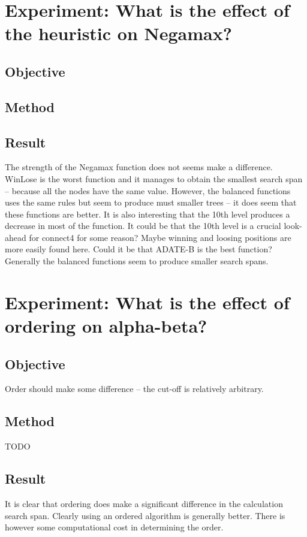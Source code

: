 \section{Experiment: What is the effect of the heuristic on Negamax?}
\subsection*{Objective}
\subsection*{Method}
\subsection*{Result}

The strength of the Negamax function does not seems make a difference.  WinLose is the worst function and it manages to obtain the smallest search span -- because all the nodes have the same value.  However, the balanced functions uses the same rules but seem to produce must smaller trees -- it does seem that these functions are better.  It is also interesting that the 10th level produces a decrease in most of the function.  It could be that the 10th level is a crucial look-ahead for connect4 for some reason? Maybe winning and loosing positions are more easily found here.  Could it be that ADATE-B is the best function?  Generally the balanced functions seem to produce smaller search spans.

\section{Experiment: What is the effect of ordering on alpha-beta?}
\subsection*{Objective}
Order should make some difference -- the cut-off is relatively arbitrary.
\subsection*{Method}
TODO
\subsection*{Result}

It is clear that ordering does make a significant difference in the calculation search span.  Clearly using an ordered algorithm is generally better.  There is however some computational cost in determining the order.  
